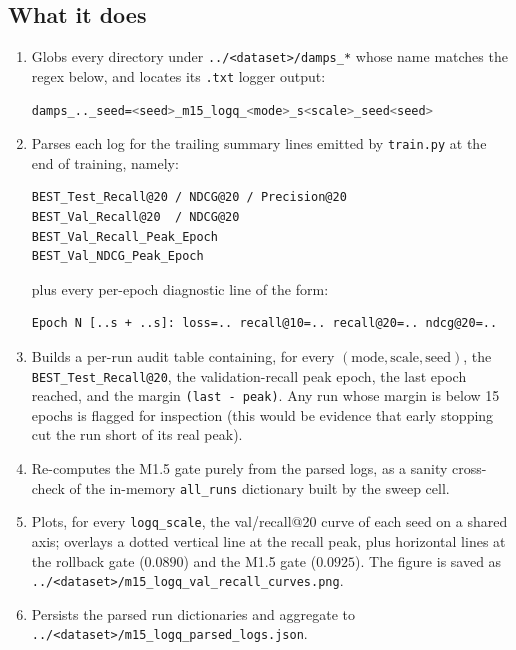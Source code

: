 \documentclass[11pt, a4paper]{article}
\begin{document}
\subsection*{What it does}
\begin{enumerate}[leftmargin=*,itemsep=3pt]
  \item Globs every directory under \texttt{../<dataset>/damps\_*} whose name
        matches the regex below, and locates its \texttt{.txt} logger output:
\begin{lstlisting}[style=py,language=bash,numbers=none]
damps_.._seed=<seed>_m15_logq_<mode>_s<scale>_seed<seed>
\end{lstlisting}
  \item Parses each log for the trailing summary lines emitted by
        \texttt{train.py} at the end of training, namely:
\begin{lstlisting}[style=py,language=bash,numbers=none]
BEST_Test_Recall@20 / NDCG@20 / Precision@20
BEST_Val_Recall@20  / NDCG@20
BEST_Val_Recall_Peak_Epoch
BEST_Val_NDCG_Peak_Epoch
\end{lstlisting}
        plus every per-epoch diagnostic line of the form:
\begin{lstlisting}[style=py,language=bash,numbers=none]
Epoch N [..s + ..s]: loss=.. recall@10=.. recall@20=.. ndcg@20=..
\end{lstlisting}
  \item Builds a per-run audit table containing, for every
        $(\text{mode}, \text{scale}, \text{seed})$, the
        \texttt{BEST\_Test\_Recall@20}, the validation-recall peak epoch, the
        last epoch reached, and the margin
        \texttt{(last - peak)}. Any run whose margin is below 15 epochs is
        flagged for inspection (this would be evidence that early stopping
        cut the run short of its real peak).
  \item Re-computes the M1.5 gate purely from the parsed logs, as a sanity
        cross-check of the in-memory \texttt{all\_runs} dictionary built by the
        sweep cell.
  \item Plots, for every \texttt{logq\_scale}, the val/recall@20 curve of each
        seed on a shared axis; overlays a dotted vertical line at the recall
        peak, plus horizontal lines at the rollback gate ($0.0890$) and the
        M1.5 gate ($0.0925$). The figure is saved as
        \texttt{../<dataset>/m15\_logq\_val\_recall\_curves.png}.
  \item Persists the parsed run dictionaries and aggregate to
        \texttt{../<dataset>/m15\_logq\_parsed\_logs.json}.
\end{enumerate}
\end{document}
